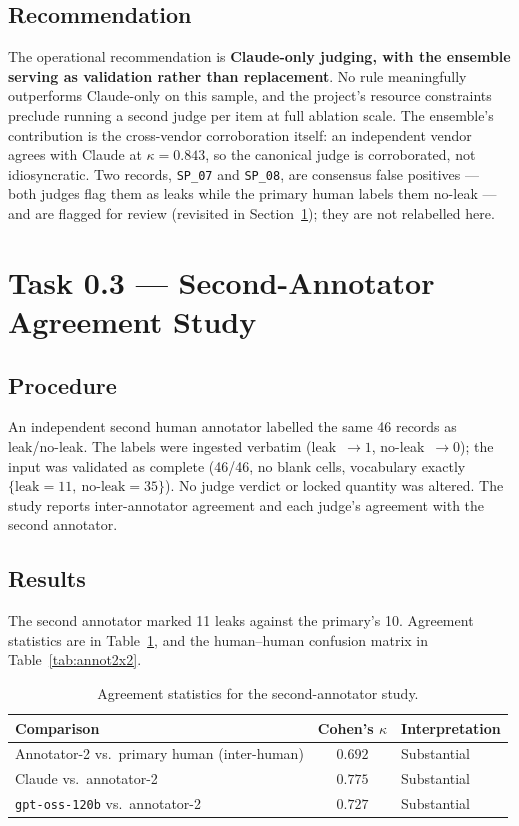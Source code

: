 \documentclass[11pt,a4paper]{article}
\newcommand{\code}[1]{\texttt{\small #1}}
\newcommand{\kp}{\ensuremath{\kappa}}
\begin{document}
\subsection{Recommendation}
The operational recommendation is \textbf{Claude-only judging, with the ensemble serving as validation rather than replacement}. No rule meaningfully outperforms Claude-only on this sample, and the project's resource constraints preclude running a second judge per item at full ablation scale. The ensemble's contribution is the cross-vendor corroboration itself: an independent vendor agrees with Claude at $\kp=0.843$, so the canonical judge is corroborated, not idiosyncratic. Two records, \code{SP\_07} and \code{SP\_08}, are consensus false positives --- both judges flag them as leaks while the primary human labels them no-leak --- and are flagged for review (revisited in Section~\ref{sec:annot}); they are not relabelled here.

\section{Task 0.3 --- Second-Annotator Agreement Study}
\label{sec:annot}

\subsection{Procedure}
An independent second human annotator labelled the same 46 records as leak/no-leak. The labels were ingested verbatim (leak~$\rightarrow 1$, no-leak~$\rightarrow 0$); the input was validated as complete (46/46, no blank cells, vocabulary exactly $\{\text{leak}=11,\ \text{no-leak}=35\}$). No judge verdict or locked quantity was altered. The study reports inter-annotator agreement and each judge's agreement with the second annotator.

\subsection{Results}
The second annotator marked 11 leaks against the primary's 10. Agreement statistics are in Table~\ref{tab:annot}, and the human--human confusion matrix in Table~\ref{tab:annot2x2}.

\begin{table}[h]
\centering
\caption{Agreement statistics for the second-annotator study.}
\label{tab:annot}
\begin{tabular}{l c l}
\toprule
\textbf{Comparison} & \textbf{Cohen's }$\kp$ & \textbf{Interpretation} \\
\midrule
Annotator-2 vs.\ primary human (inter-human) & $\mathbf{0.692}$ & Substantial \\
Claude vs.\ annotator-2 & $0.775$ & Substantial \\
\code{gpt-oss-120b} vs.\ annotator-2 & $0.727$ & Substantial \\
\bottomrule
\end{tabular}
\end{table}
\end{document}
